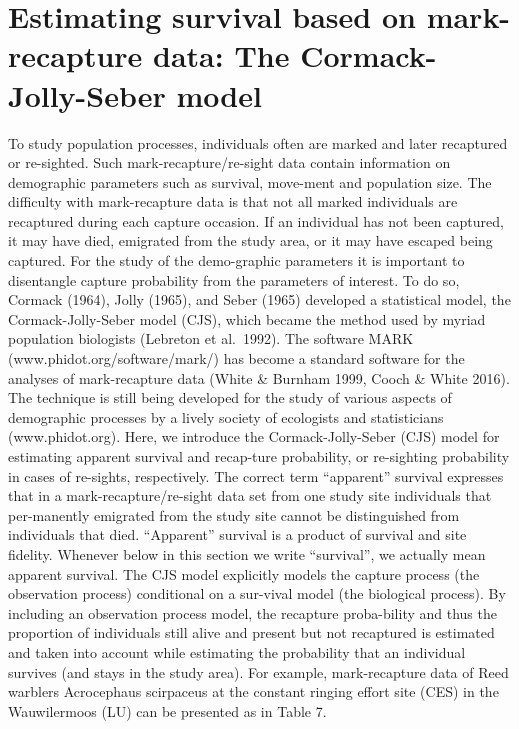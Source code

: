 \documentclass[
]{book}
\begin{document}
\hypertarget{estimating-survival-based-on-mark-recapture-data-the-cormack-jolly-seber-model}{%
\section{Estimating survival based on mark-recapture data: The Cormack-Jolly-Seber model}\label{estimating-survival-based-on-mark-recapture-data-the-cormack-jolly-seber-model}}

To study population processes, individuals often are marked and later recaptured or re-sighted. Such mark-recapture/re-sight data contain information on demographic parameters such as survival, move-ment and population size. The difficulty with mark-recapture data is that not all marked individuals are recaptured during each capture occasion. If an individual has not been captured, it may have died, emigrated from the study area, or it may have escaped being captured. For the study of the demo-graphic parameters it is important to disentangle capture probability from the parameters of interest. To do so, Cormack (1964), Jolly (1965), and Seber (1965) developed a statistical model, the Cormack-Jolly-Seber model (CJS), which became the method used by myriad population biologists (Lebreton et al.~1992). The software MARK (www.phidot.org/software/mark/) has become a standard software for the analyses of mark-recapture data (White \& Burnham 1999, Cooch \& White 2016). The technique is still being developed for the study of various aspects of demographic processes by a lively society of ecologists and statisticians (www.phidot.org).
Here, we introduce the Cormack-Jolly-Seber (CJS) model for estimating apparent survival and recap-ture probability, or re-sighting probability in cases of re-sights, respectively. The correct term ``apparent'' survival expresses that in a mark-recapture/re-sight data set from one study site individuals that per-manently emigrated from the study site cannot be distinguished from individuals that died. ``Apparent'' survival is a product of survival and site fidelity. Whenever below in this section we write ``survival'', we actually mean apparent survival.
The CJS model explicitly models the capture process (the observation process) conditional on a sur-vival model (the biological process). By including an observation process model, the recapture proba-bility and thus the proportion of individuals still alive and present but not recaptured is estimated and taken into account while estimating the probability that an individual survives (and stays in the study area).
For example, mark-recapture data of Reed warblers Acrocephaus scirpaceus at the constant ringing effort site (CES) in the Wauwilermoos (LU) can be presented as in Table 7.
\end{document}

